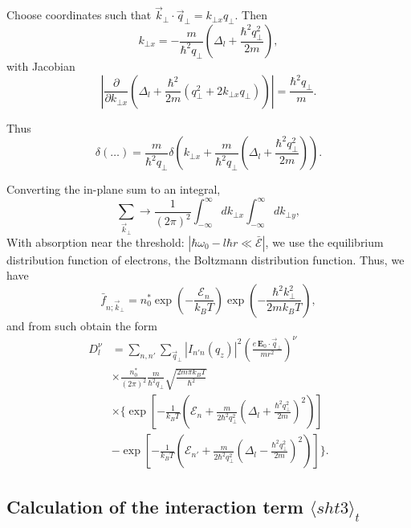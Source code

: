 \documentclass[%
 reprint,
 amsmath,amssymb,
 aps,
]{revtex4-2}
\begin{document}
Choose coordinates such that
\(
\vec k_\bot\!\cdot\!\vec q_\bot
=
k_{\bot x} q_\bot.
\)
Then
\begin{equation}
k_{\bot x}
=
-\frac{m}{\hbar^2 q_\bot}
\left(
\Delta_l+\frac{\hbar^2 q_\bot^2}{2m}
\right),
\end{equation}
with Jacobian
\begin{equation}
\left|
\frac{\partial}{\partial k_{\bot x}}
\left(
\Delta_l+\frac{\hbar^2}{2m}(q_\bot^2+2k_{\bot x}q_\bot)
\right)
\right|
=
\frac{\hbar^2 q_\bot}{m}.
\end{equation}

Thus
\begin{equation}
\delta(\dots)
=
\frac{m}{\hbar^2 q_\bot}
\delta\!\left(
k_{\bot x}
+
\frac{m}{\hbar^2 q_\bot}
\left(
\Delta_l+\frac{\hbar^2 q_\bot^2}{2m}
\right)
\right).
\end{equation}

Converting the in-plane sum to an integral,
\begin{equation}
\sum_{\vec k_\bot}
\rightarrow
\frac{1}{(2\pi)^2}
\int_{-\infty}^{\infty}
dk_{\bot x}
\int_{-\infty}^{\infty}
dk_{\bot y},
\end{equation}
With absorption near the threshold: $| \hbar \omega_0 - l \hbar r \ll \bar{\mathcal{E}} |$, we use the equilibrium distribution function of electrons, the Boltzmann distribution function. Thus, we have
\begin{equation}
\bar f_{n;\vec k_\bot}
=
n_0^*
\exp\!\left(
-\frac{\mathcal E_n}{k_B T}
\right)
\exp\!\left(
-\frac{\hbar^2 k_\bot^2}{2m k_B T}
\right),
\end{equation}
and from such obtain the form
\begin{align}
D_l^\nu
&=
\sum_{n,n'}
\sum_{\vec q_\bot}
|I_{n'n}(q_z)|^2
\left(
\frac{e\,\mathbf E_0\!\cdot\!\vec q_\bot}{m r^2}
\right)^\nu
\nonumber\\
&\times
\frac{n_0^*}{(2\pi)^2}
\frac{m}{\hbar^2 q_\bot}
\sqrt{\frac{2m\pi k_B T}{\hbar^2}}
\nonumber\\
&\times
\Bigg\{
\exp\!\left[
-\frac{1}{k_B T}
\left(
\mathcal E_n
+
\frac{m}{2\hbar^2 q_\bot^2}
\left(
\Delta_l+\frac{\hbar^2 q_\bot^2}{2m}
\right)^2
\right)
\right]
\nonumber\\
&
-
\exp\!\left[
-\frac{1}{k_B T}
\left(
\mathcal E_{n'}
+
\frac{m}{2\hbar^2 q_\bot^2}
\left(
\Delta_l-\frac{\hbar^2 q_\bot^2}{2m}
\right)^2
\right)
\right]
\Bigg\}.
\end{align}
\subsection{Calculation of the interaction term $\langle sht3 \rangle_t$}
\end{document}
